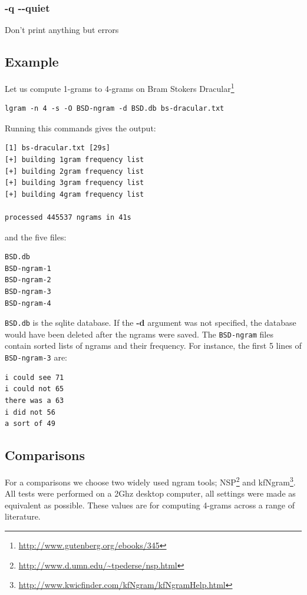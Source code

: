 \documentclass[12pt,a4paper]{report}
\begin{document}
\subsubsection{-q -{}-quiet}
Don't print anything but errors

\subsection*{Example}
Let us compute 1-grams to 4-grams on Bram Stokers Dracular\footnote{\url{http://www.gutenberg.org/ebooks/345}}
\begin{verbatim}
lgram -n 4 -s -O BSD-ngram -d BSD.db bs-dracular.txt
\end{verbatim}
Running this commands gives the output:
\begin{verbatim}
[1] bs-dracular.txt [29s]
[+] building 1gram frequency list
[+] building 2gram frequency list
[+] building 3gram frequency list
[+] building 4gram frequency list

processed 445537 ngrams in 41s
\end{verbatim}
and the five files:
\begin{verbatim}
BSD.db
BSD-ngram-1
BSD-ngram-2
BSD-ngram-3
BSD-ngram-4
\end{verbatim}
\texttt{BSD.db} is the sqlite database. If the \textbf{-d} argument was not specified, the database would have been deleted after the ngrams were saved. The \texttt{BSD-ngram} files contain sorted lists of ngrams and their frequency. For instance, the first 5 lines of \texttt{BSD-ngram-3} are:
\begin{verbatim}
i could see 71
i could not 65
there was a 63
i did not 56
a sort of 49
\end{verbatim}

\subsection*{Comparisons}
For a comparisons we choose two widely used ngram tools; NSP\footnote{\url{http://www.d.umn.edu/~tpederse/nsp.html}} and kfNgram\footnote{\url{http://www.kwicfinder.com/kfNgram/kfNgramHelp.html}}. All tests were performed on a 2Ghz desktop computer, all settings were made as equivalent as possible. These values are for computing 4-grams across a range of literature.
\end{document}
